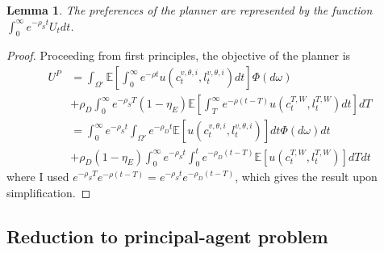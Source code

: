 \documentclass[11pt]{article}
\theoremstyle{plain}
\newtheorem{lemma}[thm]{Lemma}
\begin{document}
\begin{lemma}\label{planpreflemma}
The preferences of the planner are represented by the function $\int_0^{\infty} e^{-\rho_S t}U_tdt$.
\end{lemma}

\begin{proof}
Proceeding from first principles, the objective of the planner is
\begin{align*}
U^P & = \int_{\Omega'}\mathbb{E}{\left[\int_{0}^{\infty} e^{- \rho t}u(c^{v,\theta,i}_t,l^{v,\theta,i}_t)dt\right]} \Phi(d\omega)
\\ & + \rho_D\int_{0}^{\infty}e^{-\rho_S T} (1-\eta_E) \mathbb{E}{\left[\int_{T}^{\infty} e^{- \rho(t-T)}u(c^{T,W}_t,l^{T,W}_t)dt\right]} dT
\\ & = \int_{0}^{\infty} e^{- \rho_S t}\int_{\Omega'} e^{- \rho_D t}\mathbb{E}[u(c^{v,\theta,i}_t,l^{v,\theta,i}_t)]dt \Phi(d\omega) dt
\\ & + \rho_D (1-\eta_E)\int_{0}^{\infty} e^{- \rho_S t} \int_{0}^{t}e^{-\rho_D (t-T)}\mathbb{E}[u(c^{T,W}_t,l^{T,W}_t)]dTdt
\end{align*} %
where I used $e^{-\rho_S T}e^{- \rho (t-T)} = e^{- \rho_S t}e^{-\rho_D (t-T)}$, which gives the result upon simplification. 
\end{proof}

\subsection{Reduction to principal-agent problem}
\end{document}
